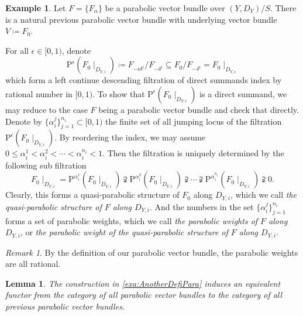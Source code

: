 \documentclass[12pt,twoside]{book}
\theoremstyle{plain}
\newtheorem{lemma}[lemma]{Lemma}
\theoremstyle{definition}
\newtheorem{example}[example]{Example}
\theoremstyle{remark}
\newtheorem{remark}[remark]{Remark}
\numberwithin{equation}{section}
\def\P{{\mathrm{P}}}
\begin{document}
\begin{example} \label{exa:AnotherDefiPara}
Let $F=\{F_\alpha\}$ be a parabolic vector bundle over $(Y,D_Y)/S$. There is a natural previous parabolic vector bundle with underlying vector bundle $V\coloneqq F_0$.

For all $\epsilon\in[0,1)$, denote
\[\P^{\epsilon}(F_0\mid_{D_{Y,i}})\coloneqq F_{-\epsilon\delta^i}/F_{-\delta^i}\subseteq F_0/F_{-\delta^i}= F_0\mid_{D_{Y,i}}\]
which form a left continue descending filtration of direct summands index by rational number in $[0,1)$. To show that $\P^{\epsilon}(F_0\mid_{D_{Y,i}})$ is a direct summand, we may reduce to the case $F$ being a parabolic vector bundle and check that directly. Denote by $\{\alpha_i^j\}_{j=1}^{n_i}\subset [0,1)$ the finite set of all jumping locus of the filtration $\P^{\epsilon}(F_0\mid_{D_{Y,i}})$. By reordering the index, we may assume $0\leq \alpha_i^1< \alpha_i^2< \cdots < \alpha^{n_i}_i<1$. Then the filtration is uniquely determined by the following sub filtration
\begin{equation} \label{equ:QuasiPara}
F_0\mid_{D_{Y,i}} = \P^{\alpha_i^1}(F_0\mid_{D_{Y,i}}) \supsetneqq \P^{\alpha_i^2}(F_0\mid_{D_{Y,i}}) \supsetneqq \cdots \supsetneqq\P^{\alpha_i^{n_i}}(F_0\mid_{D_{Y,i}}) \supsetneqq 0.
\end{equation}
Clearly, this forms a quasi-parabolic structure of $F_0$ along $D_{Y,i}$, which we call \emph{the quasi-parabolic structure of $F$ along $D_{Y,i}$}. And the numbers in the set $\{\alpha_i^j\}_{j=1}^{n_i}$ forms a set of parabolic weights, which we call \emph{the parabolic weights of $F$ along $D_{Y,i}$}, or \emph{the parabolic weight of the quasi-parabolic structure of $F$ along $D_{Y,i}$}.
\end{example}

\begin{remark}
By the definition of our parabolic vector bundle, the parabolic weights are all rational.
\end{remark}

\begin{lemma}
The construction in \autoref{exa:AnotherDefiPara} induces an equivalent functor from the category of all parabolic vector bundles to the category of all previous parabolic vector bundles.
\end{lemma}
\end{document}

